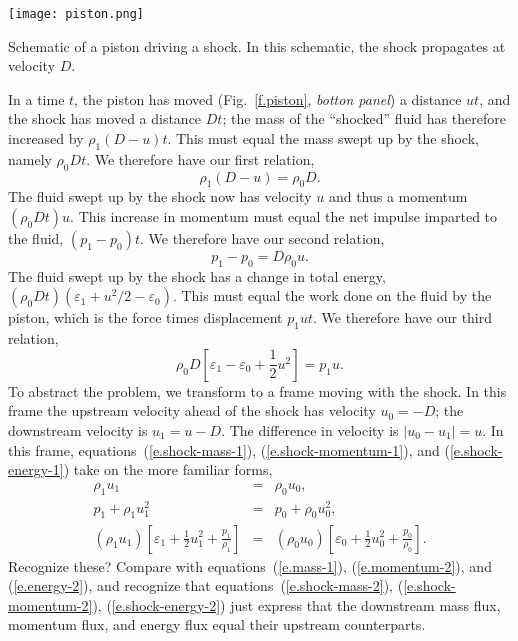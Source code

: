 \begin{marginfigure}
\texttt{[image: piston.png]}
\caption[Schematic of a piston driving a shock.]{Schematic of a piston driving a shock.  In this schematic, the shock propagates at velocity $D$.}
\label{f.piston}
\end{marginfigure}

In a time $t$, the piston has moved (Fig.~\ref{f.piston}, \emph{botton panel}) a distance $ut$, and the shock has moved a distance $Dt$; the mass of the ``shocked'' fluid has therefore increased by $\rho_{1}(D-u)t$.  This must equal the mass swept up by the shock, namely $\rho_{0}Dt$.  We therefore have our first relation,
\begin{equation}\label{e.shock-mass-1}
\rho_{1}(D-u) = \rho_{0}D.
\end{equation}
The fluid swept up by the shock now has velocity $u$ and thus a momentum $(\rho_{0}Dt)u$. This increase in momentum must equal the net impulse imparted to the fluid, $(p_{1}-p_{0})t$.  We therefore have our second relation,
\begin{equation}\label{e.shock-momentum-1}
p_{1} - p_{0} = D\rho_{0}u.
\end{equation}
The fluid swept up by the shock has a change in total energy, $(\rho_{0}D t)(\varepsilon_{1} + u^{2}/2 -\varepsilon_{0})$. This must equal the work done on the fluid by the piston, which is the force times displacement $p_{1}ut$.  We therefore have our third relation,
\begin{equation}\label{e.shock-energy-1}
\rho_{0}D\left[\varepsilon_{1}-\varepsilon_{0} + \frac{1}{2}u^{2}\right] = p_{1}u.
\end{equation}
To abstract the problem, we transform to a frame moving with the shock.  In this frame the upstream velocity ahead of the shock has velocity $u_{0} = -D$; the downstream velocity is $u_{1} = u-D$.  The difference in velocity is $|u_{0} - u_{1}| = u$.
In this frame, equations~(\ref{e.shock-mass-1}), (\ref{e.shock-momentum-1}), and (\ref{e.shock-energy-1}) take on the more familiar forms,
\begin{eqnarray}
\rho_{1}u_{1} &=& \rho_{0}u_{0},\label{e.shock-mass-2}\\
p_{1} + \rho_{1}u_{1}^{2} &=& p_{0} + \rho_{0}u_{0}^{2},\label{e.shock-momentum-2}\\
(\rho_{1}u_{1})\left[\varepsilon_{1} + \frac{1}{2}u_{1}^{2} + \frac{p_{1}}{\rho_{1}}\right] &=& 
	(\rho_{0}u_{0})\left[\varepsilon_{0} + \frac{1}{2}u_{0}^{2} + \frac{p_{0}}{\rho_{0}}\right]. 
			\label{e.shock-energy-2}
\end{eqnarray}
Recognize these?  Compare with equations~(\ref{e.mass-1}), (\ref{e.momentum-2}), and (\ref{e.energy-2}), and recognize that equations~(\ref{e.shock-mass-2}), (\ref{e.shock-momentum-2}), (\ref{e.shock-energy-2}) just express that the downstream mass flux, momentum flux, and energy flux equal their upstream counterparts.

